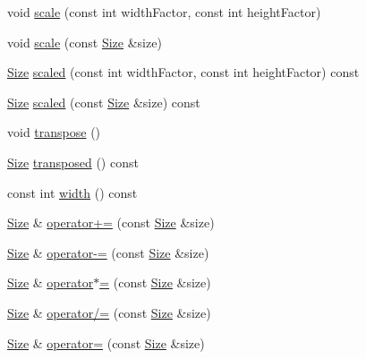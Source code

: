 \begin{DoxyCompactItemize}
\item 
void \hyperlink{classprism_1_1geometry_1_1_size_ab53d9d0e247a8505a9e884cf26213e7d}{scale} (const int width\+Factor, const int height\+Factor)
\item 
void \hyperlink{classprism_1_1geometry_1_1_size_ac1ac0d2a905e60962f2123e3ffcc5dbc}{scale} (const \hyperlink{classprism_1_1geometry_1_1_size}{Size} \&size)
\item 
\hyperlink{classprism_1_1geometry_1_1_size}{Size} \hyperlink{classprism_1_1geometry_1_1_size_a4ce86d68cae4723b7213b6bad0a09c0c}{scaled} (const int width\+Factor, const int height\+Factor) const 
\item 
\hyperlink{classprism_1_1geometry_1_1_size}{Size} \hyperlink{classprism_1_1geometry_1_1_size_af66c230981ee22a00ed281d623ca9d1a}{scaled} (const \hyperlink{classprism_1_1geometry_1_1_size}{Size} \&size) const 
\item 
void \hyperlink{classprism_1_1geometry_1_1_size_a39edd14856a71a0b3b2bbecb7d3745f9}{transpose} ()
\item 
\hyperlink{classprism_1_1geometry_1_1_size}{Size} \hyperlink{classprism_1_1geometry_1_1_size_a3aa4f38416f5276247ac75cab7c470f3}{transposed} () const 
\item 
const int \hyperlink{classprism_1_1geometry_1_1_size_af52e54cbd5b29a1d9a2dfd3b56007d68}{width} () const 
\item 
\hyperlink{classprism_1_1geometry_1_1_size}{Size} \& \hyperlink{classprism_1_1geometry_1_1_size_a924a15d97e1e8d262357ad7568b1d0b6}{operator+=} (const \hyperlink{classprism_1_1geometry_1_1_size}{Size} \&size)
\item 
\hyperlink{classprism_1_1geometry_1_1_size}{Size} \& \hyperlink{classprism_1_1geometry_1_1_size_aa9222e44ac7745635d7903747fb962e5}{operator-\/=} (const \hyperlink{classprism_1_1geometry_1_1_size}{Size} \&size)
\item 
\hyperlink{classprism_1_1geometry_1_1_size}{Size} \& \hyperlink{classprism_1_1geometry_1_1_size_adbf6070617ee8d49a66d4dbae5fe4cda}{operator$\ast$=} (const \hyperlink{classprism_1_1geometry_1_1_size}{Size} \&size)
\item 
\hyperlink{classprism_1_1geometry_1_1_size}{Size} \& \hyperlink{classprism_1_1geometry_1_1_size_a40bc23d348aa442f5a5666f7d93ee7a9}{operator/=} (const \hyperlink{classprism_1_1geometry_1_1_size}{Size} \&size)
\item 
\hyperlink{classprism_1_1geometry_1_1_size}{Size} \& \hyperlink{classprism_1_1geometry_1_1_size_a9de24c3d0a1ea307029e2a3fcc74f7a1}{operator=} (const \hyperlink{classprism_1_1geometry_1_1_size}{Size} \&size)
\end{DoxyCompactItemize}
